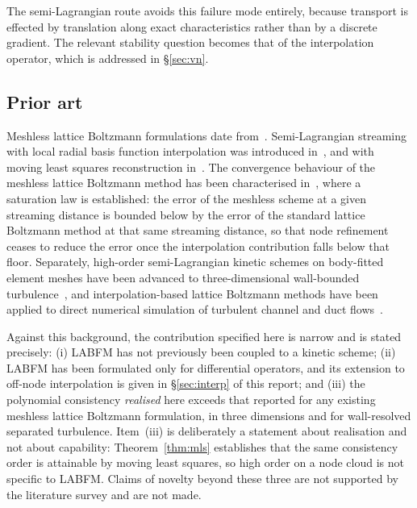 \documentclass[11pt,a4paper]{article}
\begin{document}
The semi-Lagrangian route avoids this failure mode entirely, because transport is
effected by translation along exact characteristics rather than by a discrete
gradient. The relevant stability question becomes that of the interpolation operator,
which is addressed in \S\ref{sec:vn}.

\subsection{Prior art}

Meshless lattice Boltzmann formulations date from~\cite{Musavi2015}. Semi-Lagrangian
streaming with local radial basis function interpolation was introduced
in~\cite{LinWuZhang2019}, and with moving least squares reconstruction
in~\cite{WangYang2025}. The convergence behaviour of the meshless lattice Boltzmann
method has been characterised in~\cite{Strzelczyk2023,Strzelczyk2024}, where a
saturation law is established: the error of the meshless scheme at a given streaming
distance is bounded below by the error of the standard lattice Boltzmann method at
that same streaming distance, so that node refinement ceases to reduce the error once
the interpolation contribution falls below that floor. Separately, high-order
semi-Lagrangian kinetic schemes on body-fitted element meshes have been advanced to
three-dimensional wall-bounded turbulence~\cite{Kramer2017,Wilde2020,Wilde2021,%
Spelten2024}, and interpolation-based lattice Boltzmann methods have been applied to
direct numerical simulation of turbulent channel and duct flows~\cite{Jin2025}.

Against this background, the contribution specified here is narrow and is stated
precisely: (i) LABFM has not previously been coupled to a kinetic scheme; (ii) LABFM
has been formulated only for differential operators, and its extension to off-node
interpolation is given in \S\ref{sec:interp} of this report; and (iii) the polynomial
consistency \emph{realised} here exceeds that reported for any existing meshless
lattice Boltzmann formulation, in three dimensions and for wall-resolved separated
turbulence. Item~(iii) is deliberately a statement about realisation and not about
capability: Theorem~\ref{thm:mls} establishes that the same consistency order is
attainable by moving least squares, so high order on a node cloud is not specific to
LABFM. Claims of novelty beyond these three are not supported by the literature survey
and are not made.

\end{document}
